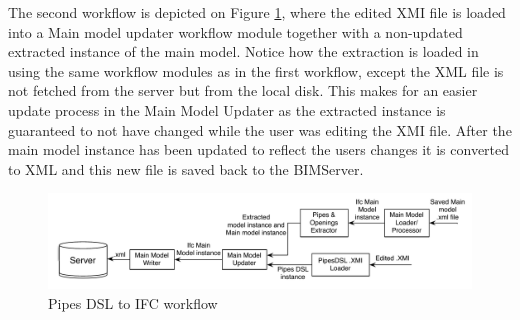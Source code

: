 The second workflow is depicted on Figure \ref{fig:Pipes2IFCWorkflow}, where the edited XMI file is loaded into a Main model updater workflow module together with a non-updated extracted instance of the main model. Notice how the extraction is loaded in using the same workflow modules as in the first workflow, except the XML file is not fetched from the server but from the local disk. This makes for an easier update process in the Main Model Updater as the extracted instance is guaranteed to not have changed while the user was editing the XMI file. After the main model instance has been updated to reflect the users changes it is converted to XML and this new file is saved back to the BIMServer.

\begin{figure}[htbp]
    \centering
        \includegraphics[width=120mm]{images/Pipes2IFC.pdf}
    \caption{Pipes DSL to IFC workflow}
    \label{fig:Pipes2IFCWorkflow}
\end{figure}







